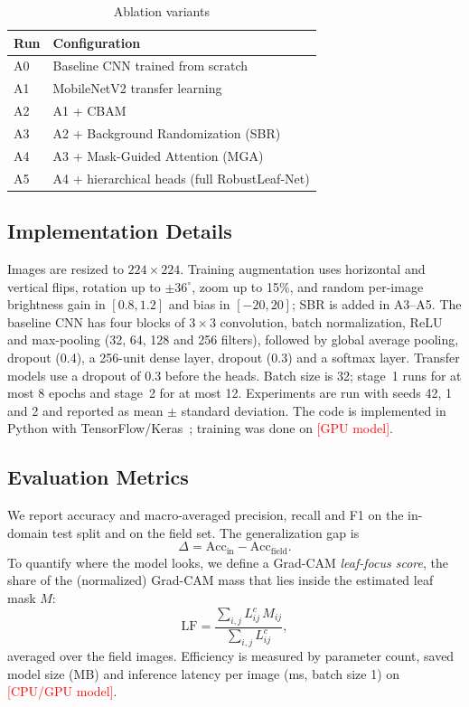 \documentclass[conference]{IEEEtran}
\newcommand{\tbd}[1]{\textcolor{red}{#1}}
\newcommand{\GPUName}{\tbd{[GPU model]}}\newcommand{\DeviceName}{\tbd{[CPU/GPU model]}}
\begin{document}
\begin{table}[!t]
\caption{Ablation variants}
\label{tab:ablation_def}
\centering
\small
\begin{tabular}{@{}ll@{}}
\toprule
Run & Configuration \\
\midrule
A0 & Baseline CNN trained from scratch \\
A1 & MobileNetV2 transfer learning \\
A2 & A1 + CBAM \\
A3 & A2 + Background Randomization (SBR) \\
A4 & A3 + Mask-Guided Attention (MGA) \\
A5 & A4 + hierarchical heads (full RobustLeaf-Net) \\
\bottomrule
\end{tabular}
\end{table}

\subsection{Implementation Details}
Images are resized to $224\times224$. Training augmentation uses horizontal and vertical flips, rotation up to $\pm36^\circ$, zoom up to 15\%, and random per-image brightness gain in $[0.8,1.2]$ and bias in $[-20,20]$; SBR is added in A3--A5. The baseline CNN has four blocks of $3\times3$ convolution, batch normalization, ReLU and max-pooling (32, 64, 128 and 256 filters), followed by global average pooling, dropout (0.4), a 256-unit dense layer, dropout (0.3) and a softmax layer. Transfer models use a dropout of 0.3 before the heads. Batch size is 32; stage~1 runs for at most 8 epochs and stage~2 for at most 12. Experiments are run with seeds 42, 1 and 2 and reported as mean $\pm$ standard deviation. The code is implemented in Python with TensorFlow/Keras~\cite{abadi2016}; training was done on \GPUName{}.

\subsection{Evaluation Metrics}
We report accuracy and macro-averaged precision, recall and F1 on the in-domain test split and on the field set. The generalization gap is
\begin{equation}
\Delta = \mathrm{Acc}_{\mathrm{in}} - \mathrm{Acc}_{\mathrm{field}} .
\end{equation}
To quantify where the model looks, we define a Grad-CAM \emph{leaf-focus score}, the share of the (normalized) Grad-CAM mass that lies inside the estimated leaf mask $M$:
\begin{equation}
\mathrm{LF} = \frac{\sum_{i,j} L^{c}_{ij}\,M_{ij}}{\sum_{i,j} L^{c}_{ij}},
\end{equation}
averaged over the field images. Efficiency is measured by parameter count, saved model size (MB) and inference latency per image (ms, batch size 1) on \DeviceName{}.
\end{document}
